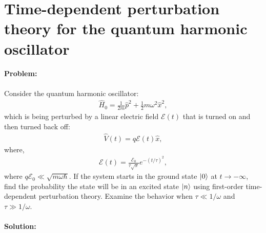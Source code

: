 \documentclass[10pt]{article}
\newcommand{\1}{\mathbf 1}
\begin{document}

\section*{Time-dependent perturbation theory for the quantum harmonic oscillator}


\paragraph{Problem:}

Consider the quantum harmonic oscillator:
\begin{align}
	\hat H_0
	=
	\frac{1}{2m}\hat p^2
	+
	\frac{1}{2}m \omega^2 \hat x^2,
\end{align}
which is being perturbed by a linear electric field $\mathcal{E}(t)$ that is turned on and then turned back off:
\begin{align}
	\hat V(t)
	=
	q \mathcal{E}(t) \hat x,
\end{align}
where,
\begin{align}
	\mathcal{E}(t)
	=
	\frac{\mathcal{E}_0}{\tau\sqrt{\pi}}
	e^{-(t/\tau)^2},
\end{align}
where $q\mathcal{E}_0 \ll \sqrt{m\omega\hbar}$.
If the system starts in the ground state $\ket{0}$ at $t \to -\infty$, find the probability the state will be in an excited state $\ket{n}$ using first-order time-dependent perturbation theory.
Examine the behavior when $\tau \ll 1/\omega$ and $\tau \gg 1/\omega$.


\paragraph{Solution:}
\end{document}
